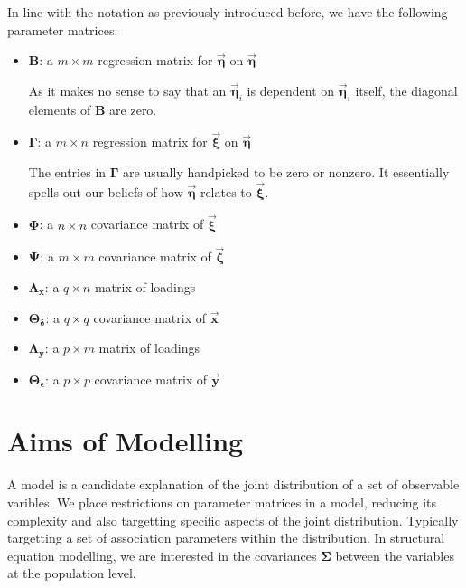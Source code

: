 \documentclass{article}
\begin{document}
\begin{multicols*}{2}
In line with the notation as previously introduced before, we have the following parameter matrices:

\begin{itemize}
    \item $\mathbf{B}$: a $m \times m$ regression matrix for $\mathbf{\vec{\eta}}$ on $\mathbf{\vec{\eta}}$
    
    As it makes no sense to say that an $\mathbf{\vec{\eta}}_i$ is dependent on $\mathbf{\vec{\eta}}_i$ itself, the diagonal elements of $\mathbf{B}$ are zero.

    \item $\mathbf{\Gamma}$: a $m \times n$ regression matrix for $\mathbf{\vec{\xi}}$ on $\mathbf{\vec{\eta}}$
    
    The entries in $\mathbf{\Gamma}$ are usually handpicked to be zero or nonzero. It essentially spells out our beliefs of how $\mathbf{\vec{\eta}}$ relates to $\mathbf{\vec{\xi}}$.

    \item $\mathbf{\Phi}$: a $n \times n$ covariance matrix of $\mathbf{\vec{\xi}}$
    \item $\mathbf{\Psi}$: a $m \times m$ covariance matrix of $\mathbf{\vec{\zeta}}$

    \item $\mathbf{\Lambda_x}$: a $ q \times n$ matrix of loadings

    \item $\mathbf{\Theta_\delta}$: a $q \times q$ covariance matrix of $\mathbf{\vec{x}}$

    \item $\mathbf{\Lambda_y}$: a $p \times m$ matrix of loadings

    \item $\mathbf{\Theta_\epsilon}$: a $p \times p$ covariance matrix of $\mathbf{\vec{y}}$
    
\end{itemize}

\section{Aims of Modelling}

A model is a candidate explanation of the joint distribution of a set of observable varibles. We place restrictions on parameter matrices in a model, reducing its complexity and also targetting specific aspects of the joint distribution. Typically targetting a set of association parameters within the distribution. In structural equation modelling, we are interested in the covariances $\mathbf{\Sigma}$ between the variables at the population level.


\end{multicols*}
\end{document}
